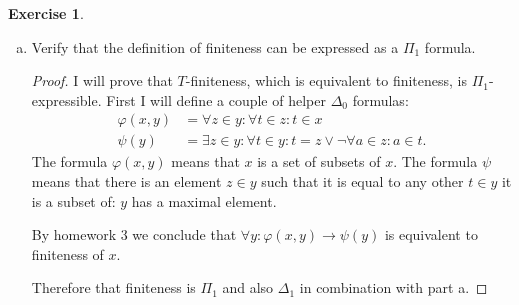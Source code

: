 \documentclass{article}
\theoremstyle{definition}
\newtheorem{question}{Exercise}
\begin{document}
\begin{question}
\begin{enumerate}[a.]
\begin{proof}
                  Therefore finiteness is a \(\Sigma_{1}\) property.
              \end{proof}

        \item Verify that the definition of finiteness can be expressed as a
              \(\Pi_{1}\) formula.

              \begin{proof}
                  I will prove that \(T\)-finiteness, which is equivalent to
                  finiteness, is \(\Pi_{1}\)-expressible. First I will define a
                  couple of helper \(\Delta_{0}\) formulas:
                  \begin{align*}
                      \varphi(x,y) & =\forall z\in y:\forall t\in z:t\in x                             \\
                      \psi(y)      & =\exists z\in y:\forall t\in y:t=z\vee \neg\forall a\in z:a\in t.
                  \end{align*}
                  The formula \(\varphi(x,y)\) means that \(x\) is a set of
                  subsets of \(x\). The formula \(\psi\) means that there is an
                  element \(z\in y\) such that it is equal to any other \(t\in
                  y\) it is a subset of: \(y\) has a maximal element.

                  By homework 3 we conclude that \(\forall
                  y:\varphi(x,y)\to\psi(y)\) is equivalent to finiteness of
                  \(x\).\

                  Therefore that finiteness is \(\Pi_{1}\) and also
                  \(\Delta_{1}\) in combination with part a.
              \end{proof}
    \end{enumerate}
\end{question}
\end{document}
